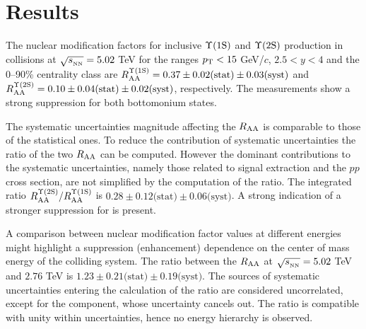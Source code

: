
\section{Results}\label{section:results}

The nuclear modification factors for  inclusive $\mbox{$\Upsilon$(1S)}$ and $\mbox{$\Upsilon$(2S)}$ production in \pbpb collisions at $\sqrt{s_{_{\rm NN}}}=5.02$ \rm{TeV} for the ranges $p_{\rm T} < 15$ GeV/$c$, $2.5 < y < 4$ and the 0--90\% centrality class are $R_{\rm{AA}}^{\Upsilon(\rm1S)}=0.37\pm0.02\text{(stat)}\pm0.03\text{(syst)}$  and $R_{\rm{AA}}^{\Upsilon(\rm2S)}=0.10\pm{0.04}\text{(stat)}\pm{0.02}\text{(syst)}$, respectively. 
The measurements show a strong suppression for both bottomonium states.

The systematic uncertainties magnitude affecting the $R_{\rm{AA}}$ is comparable to those of the statistical ones.
To reduce the contribution of systematic uncertainties the ratio of the two $R_{\rm{AA}}$ can be computed.
However the dominant contributions to the systematic uncertainties, namely those related to signal extraction and the $pp$ cross section, are not simplified by the computation of the ratio.
The integrated ratio $R_{\rm{AA}}^{\Upsilon(\rm2S)}/R_{\rm{AA}}^{\Upsilon(\rm1S)}$ is $0.28\pm0.12\text{(stat)}\pm0.06\text{(syst)}$. 
A strong indication of a stronger suppression for \upsiss is present.

A comparison between \upsis nuclear modification factor values at different energies might highlight a suppression (enhancement) dependence on the center of mass energy of the colliding system.
The ratio between the \upsis $\mbox{$R_{\rm{AA}}$}$ at $\sqrt{s_{_{\rm NN}}}=5.02$ \rm{TeV} and $2.76$ \rm{TeV} is $1.23\pm0.21\text{(stat)}\pm0.19\text{(syst)}$. 
The sources of systematic uncertainties entering the calculation of the ratio are considered uncorrelated, except for the \taa component, whose uncertainty cancels out. 
The ratio is compatible with unity within uncertainties, hence no energy hierarchy is observed.

